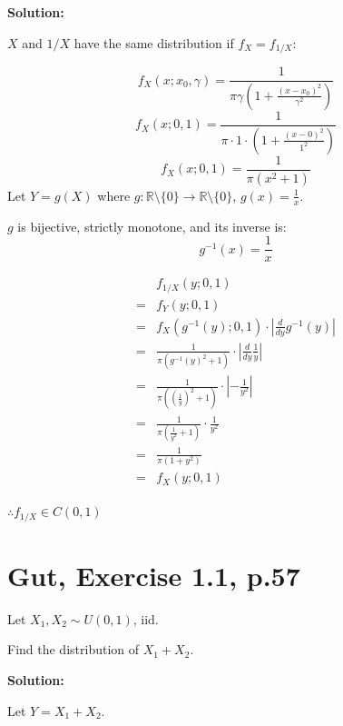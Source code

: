 \documentclass{article}
\begin{document}
\textbf{Solution:}

\(X\) and \(1/X\) have the same distribution if \(f_X=f_{1/X}\):

\[f_X(x;x_0,\gamma) = \frac{1}{\pi\gamma(1+\frac{(x-x_0)^2}{\gamma^2})}\]
\[f_X(x;0,1) = \frac{1}{\pi \cdot 1 \cdot (1+\frac{(x-0)^2}{1^2})}\]
\[f_X(x;0,1) = \frac{1}{\pi (x^2+1)}\]
Let \(Y=g(X)\) where \(g: \mathbb{R}\setminus\{0\}\to\mathbb{R}\setminus\{0\}\), \(g(x) = \frac{1}{x}\).

\(g\) is bijective, strictly monotone, and its inverse is:
\[g^{-1}(x) = \frac{1}{x}\]

\begin{align*}
 & f_{1/X}(y;0,1) \\
=& f_Y(y;0,1) \\
=& f_X(g^{-1}(y);0,1) \cdot |\frac{d}{dy}g^{-1}(y)| \\
=& \frac{1}{\pi (g^{-1}(y)^2+1)} \cdot |\frac{d}{dy}\frac{1}{y}| \\
=& \frac{1}{\pi ((\frac{1}{y})^2+1)} \cdot |-\frac{1}{y^2}| \\
=& \frac{1}{\pi (\frac{1}{y^2}+1)} \cdot \frac{1}{y^2} \\
=& \frac{1}{\pi (1+y^2)} \\
=& f_X(y;0,1) \\
\end{align*}

\(\therefore f_{1/X}\in C(0,1)\)

\section{Gut, Exercise 1.1, p.57}

Let \(X_1,X_2 \sim U(0,1)\), iid.

Find the distribution of \(X_1+X_2\).

\textbf{Solution:}

Let \(Y=X_1+X_2\).
\end{document}
